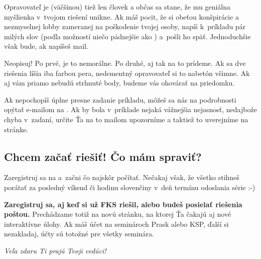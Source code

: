 	Opravovateľ je (väčšinou) tiež len človek a občas sa stane, že mu geniálna
	myšlienka v~tvojom riešení unikne. Ak máš pocit, že si obeťou konšpirácie a
	nezmyselnej lobby zameranej na poškodenie tvojej osoby, napíš k~príkladu pár
	milých slov (podľa možností niečo pádnejšie ako ) a~pošli
	ho späť. Jednoduchšie však bude, ak napíšeš mail.

	Neopisuj! Po prvé, je to nemorálne. Po druhé, aj tak na to prídeme. Ak sa dve riešenia
	líšia iba farbou pera, nedementný opravovateľ si to nabetón všimne. Ak aj vám
	priamo nebudú strhnuté body, budeme vás ohovárať na priedomku.

	Ak nepochopíš úplne presne zadanie príkladu, môžeš sa nás na podrobnosti opýtať
	e-mailom na {\URL{\seminarEmail}}. Ak by bola v~príklade nejaká vážnejšia
	nejasnosť, nedajbože chyba v~zadaní, určite Ťa na to mailom upozorníme a taktiež to uverejníme na stránke.

\subsection{Chcem začať riešiť! Čo mám spraviť?}
	Zaregistruj sa na \URL{\seminarURL} a~začni čo najskôr počítať. Nečakaj však, že všetko stihneš porátať
	za posledný víkend či hodinu slovenčiny v~deň termínu odoslania série :-)

\textbf{Zaregistruj sa, aj keď si už FKS riešil, alebo budeš posielať riešenia poštou.}
Prechádzame totiž na novú stránku, na ktorej Ťa čakajú aj nové interaktívne úlohy. Ak máš účet na seminároch Prask alebo KSP, ďalší si nezakladaj, účty sú totožné pre všetky seminára.

\hfill \emph{Veľa zdaru Ti prajú Tvoji vedúci!}%

